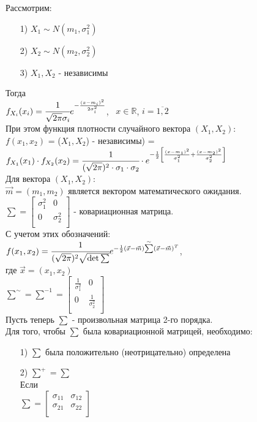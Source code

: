 Рассмотрим:
\begin{enumerate}
	\item[1)] $X_1 \sim N(m_1, \sigma_1^2)$
	\item[2)] $X_2 \sim N(m_2, \sigma_2^2)$
	\item[3)] $X_1, X_2$ - независимы
\end{enumerate}
Тогда\\
$f_{X_i}(x_i) = \cfrac{1}{\sqrt{2\pi} \sigma_i} e^{- \frac{(x - m_i)^2}{2 \sigma_i^2}}$, \ $x \in \mathbb{R}$, $i = \overline{1, 2}$\\
При этом функция плотности случайного вектора $(X_1, X_2)$:\\
$f(x_1, x_2)$ = ($X_1, X_2$) - независимы) = $f_{X_1} (x_1) \cdot f_{X_2} (x_2) = \cfrac{1}{(\sqrt{2\pi})^2 \cdot \sigma_1 \cdot \sigma_2} \cdot e^{- \frac12 \left[ \frac{(x - m_1)^2}{\sigma_1^2} + \frac{(x - m_2)^2}{\sigma_2^2}\right]}$\\
Для вектора $(X_1, X_2)$:\\
$\vec{m} = (m_1, m_2)$ является вектором математического ожидания.
\\
$\sum = 
\begin{bmatrix}
	\sigma_1^2 & 0 \\
	0 & \sigma_2^2 \\
\end{bmatrix}$ - ковариационная матрица.
\\
С учетом этих обозначений:\\
$f(x_1, x_2) = \cfrac{1}{(\sqrt{2\pi})^2 \sqrt{\det{\sum}}} e^{-\frac12 (\vec{x} - \vec{m}) \overset{\sim}{\sum} (\vec{x} - \vec{m})^T}$,\\
где $\vec{x} = (x_1, x_2)$\\
$\overset{\sim}{\sum} = \sum^{-1} = 
\begin{bmatrix}
	\frac{1}{\sigma_1^2}	& 0 \\
	0	& \frac{1}{\sigma_2^2} \\
\end{bmatrix}$
\\
Пусть теперь $\sum$ - произвольная матрица 2-го порядка.\\
Для того, чтобы $\sum$ была ковариационной матрицей, необходимо:\\
\begin{enumerate}
	\item[1)] $\sum$ была положительно (неотрицательно) определена
	
	\item[2)] $\sum^+ = \sum$\\
	Если\\
	$\sum = 
	\begin{bmatrix}
		\sigma_{11}	&	\sigma_{12} \\
		\sigma_{21}	&	\sigma_{22} \\
	\end{bmatrix}$\\
\end{enumerate}
